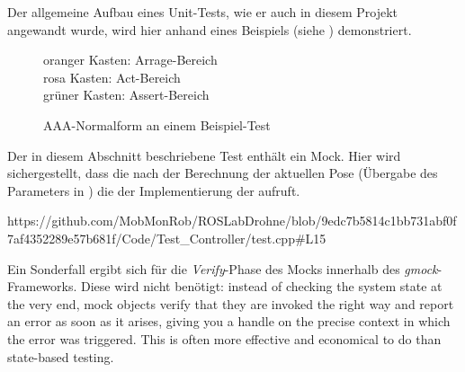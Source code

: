 Der allgemeine Aufbau eines Unit-Tests, wie er auch in diesem Projekt angewandt wurde, wird hier anhand eines Beispiels (siehe ) demonstriert.

\begin{figure}[ht!]
\vspace{0.25cm}
\begin{center}
\caption{AAA-Normalform an einem Beispiel-Test}
\label{fig:TestAAA}
\end{center}

\vspace{0.25cm}
oranger Kasten:	Arrage-Bereich\\
rosa Kasten: Act-Bereich\\
grüner Kasten: Assert-Bereich
\end{figure}



Der in diesem Abschnitt beschriebene Test enthält ein Mock.
Hier wird sichergestellt, dass die  nach der Berechnung der aktuellen Pose (Übergabe des Parameters in ) die  der Implementierung der  aufruft.

https://github.com/MobMonRob/ROSLabDrohne/blob/9edc7b5814c1bb731abf0f7af4352289e57b681f/Code/Test\_Controller/test.cpp\#L15

Ein Sonderfall ergibt sich für die \textit{Verify}-Phase des Mocks innerhalb des \textit{gmock}-Frameworks. Diese wird nicht benötigt:
\glqq instead of checking the system state at the very end, mock objects verify that they are invoked the right way and report an error as soon as it arises, giving you a handle on the precise context in which the error was triggered. This is often more effective and economical to do than state-based testing.\grqq \cite{gmockFAQ}


